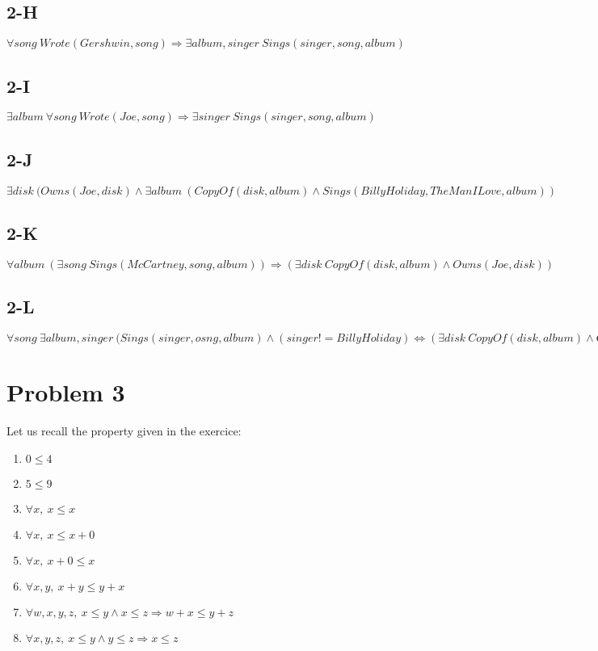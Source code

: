 \documentclass{article}
\begin{document}
        \subsection{2-H}
            $\forall song\: Wrote(Gershwin, song) \Rightarrow \exists album, singer\: Sings(singer, song, album)$
        \subsection{2-I}
            $\exists album\: \forall song\: Wrote(Joe, song) \Rightarrow \exists singer\: Sings(singer, song, album)$
        \subsection{2-J}
            $\exists disk\: (Owns(Joe, disk)\land\exists album\: (CopyOf(disk, album)\land Sings(Billy Holiday, The Man I Love, album))$
        \subsection{2-K}
            $\forall album\: (\exists song\: Sings(McCartney, song, album))\Rightarrow(\exists disk\: CopyOf(disk, album)\land Owns(Joe, disk))$
        \subsection{2-L}
            $\forall song\: \exists album, singer\: (Sings(singer, osng, album)\land(singer!=Billy Holiday) \Leftrightarrow (\exists disk\: CopyOf(disk, album)\land Owns(Joe, disk))$
    \section{Problem 3}
        Let us recall the property given in the exercice:
        \begin{enumerate}
            \item $0\le 4$
            \item $5\le 9$
            \item $\forall x,\: x\le x$
            \item $\forall x,\: x\le x+0$
            \item $\forall x,\: x+0\le x$
            \item $\forall x,y,\: x+y\le y+x$
            \item $\forall w,x,y,z,\: x\le y\land x\le z \Rightarrow w+x\le y+z$
            \item $\forall x,y,z,\: x\le y\land y\le z\Rightarrow x\le z$
        \end{enumerate}
\end{document}
